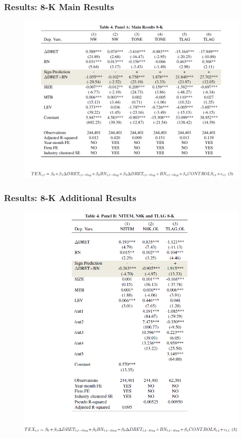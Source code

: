 \documentclass{beamer}
\begin{document}
\begin{frame}
\frametitle{Results: 8-K Main Results}
	\begin{figure}[h]
	\centering
	\includegraphics[width=0.75\linewidth]{tab4panA}
	\label{tab4panA}
	\end{figure}
\end{frame}
\begin{frame}
\frametitle{Results: 8-K Additional Results}
	\begin{figure}[h]
	\centering
	\includegraphics[width=0.6\linewidth]{tab4panB}
	\label{tab4panB}
	\end{figure}
\end{frame}
\end{document}
